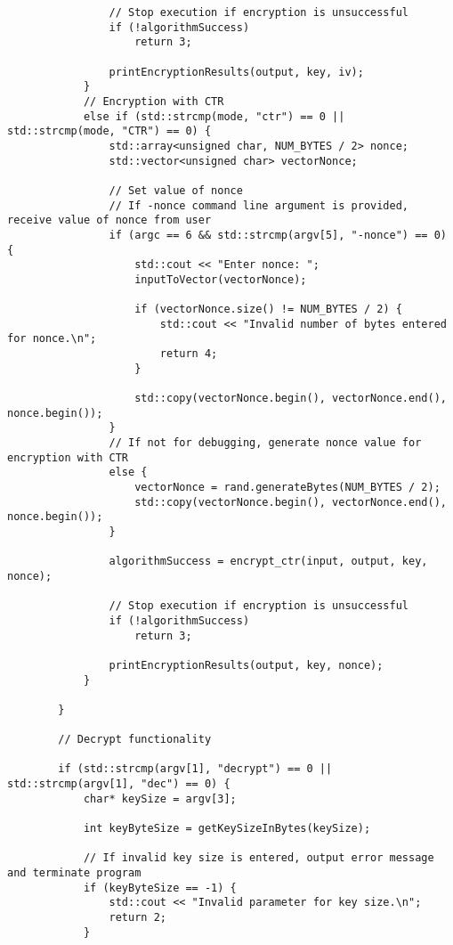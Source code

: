 \documentclass[a4paper,12pt]{article}
\begin{document}
{\begin{lstlisting}
                // Stop execution if encryption is unsuccessful
                if (!algorithmSuccess)
                    return 3;

                printEncryptionResults(output, key, iv);
            }
            // Encryption with CTR
            else if (std::strcmp(mode, "ctr") == 0 || std::strcmp(mode, "CTR") == 0) {
                std::array<unsigned char, NUM_BYTES / 2> nonce;
                std::vector<unsigned char> vectorNonce;

                // Set value of nonce
                // If -nonce command line argument is provided, receive value of nonce from user
                if (argc == 6 && std::strcmp(argv[5], "-nonce") == 0) {
                    std::cout << "Enter nonce: ";
                    inputToVector(vectorNonce);

                    if (vectorNonce.size() != NUM_BYTES / 2) {
                        std::cout << "Invalid number of bytes entered for nonce.\n";
                        return 4;
                    }

                    std::copy(vectorNonce.begin(), vectorNonce.end(), nonce.begin());
                }
                // If not for debugging, generate nonce value for encryption with CTR
                else {
                    vectorNonce = rand.generateBytes(NUM_BYTES / 2);
                    std::copy(vectorNonce.begin(), vectorNonce.end(), nonce.begin());
                }

                algorithmSuccess = encrypt_ctr(input, output, key, nonce);

                // Stop execution if encryption is unsuccessful
                if (!algorithmSuccess)
                    return 3;

                printEncryptionResults(output, key, nonce);
            }

        }

        // Decrypt functionality

        if (std::strcmp(argv[1], "decrypt") == 0 || std::strcmp(argv[1], "dec") == 0) {
            char* keySize = argv[3];

            int keyByteSize = getKeySizeInBytes(keySize);

            // If invalid key size is entered, output error message and terminate program
            if (keyByteSize == -1) {
                std::cout << "Invalid parameter for key size.\n";
                return 2;
            }



\end{lstlisting}}
\end{document}

